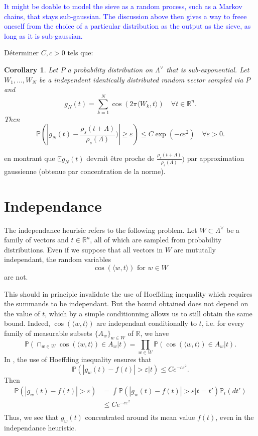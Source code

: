 \documentclass{article}
\newtheorem{corollary}{Corollary}[theorem]
\begin{document}
\textcolor{blue}{It might be doable to model the sieve as a random process, such as a Markov chains, that stays sub-gaussian. The discussion above then gives a way to freee oneself from the choice of a particular distribution as the output as the sieve, as long as it is sub-gaussian.}

Déterminer $C,c> 0$ tels que:
\begin{corollary}
Let $P$ a probability distribution on $\Lambda^\vee$ that is sub-exponential. Let $W_1,\ldots , W_N$ be a independent identically distributed random vector sampled via $P$ and 
\[g_N(t) = \sum_{k=1}^N\cos(2\pi \langle W_k,t\rangle )\quad\forall t\in\mathbb R^n.\] 
Then 
\[\mathbb P( |g_N(t) - \frac{\rho_s(t+\Lambda)}{\rho_s(\Lambda)}) |\geq \varepsilon ) \leq  C \exp( - c\varepsilon^2) \quad \forall \varepsilon >0.\]
\end{corollary}
en montrant que $\mathbb Eg_N(t) $ devrait être proche de $\frac{\rho_s(t+\Lambda)}{\rho_s(\Lambda)})$ par approximation gaussienne (obtenue par concentration de la norme).

\section{Independance}  %

The independance heurisic refers to the following problem. Let $W\subset  \Lambda^\vee$ be a family of vectors and $t\in \mathbb R^n$, all of which are sampled from probability distributions. Even if we suppose that all vectors in $W$ are mututally independant, the random variables 
\[\cos (\langle w ,t \rangle) \text{ for }w\in W\]
are not. 

This should in principle invalidate the use of Hoeffding inequality which requires the summands to be independant. But the bound obtained does not depend on the value of $t$, which by a simple conditionning allows us to still obtain the same bound. Indeed, $\cos (\langle w ,t \rangle)$ are independant conditionally to $t$, i.e. for every family of measurable subsets $\{A_w\}_{w\in W}$ of $\mathbb R$, we have
\[ \mathbb P(\cap_{w\in W} \cos (\langle w ,t \rangle) \in A_w | t) =\prod_{w\in W} \mathbb P(\cos (\langle w ,t \rangle) \in A_w | t) .\] 
In \cite{PoulyShen}, the use of Hoeffding inequality ensures that
\[\mathbb P(|g_w(t)-f(t)| > \varepsilon |t) \leq Ce^{-c\varepsilon^2}.\]
Then 
\[\begin{split}
\mathbb P(|g_w(t)-f(t)| > \varepsilon ) & =\int \mathbb P(|g_w(t)-f(t)| > \varepsilon |t = t')\mathbb P_t(dt') \\
		& \leq Ce^{-c\varepsilon^2}\\
\end{split}\]
Thus, we see that $g_w(t)$ concentrated around its mean value $f(t)$, even in the independance heuristic.
\end{document}
